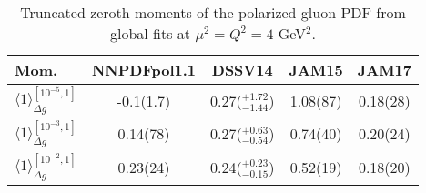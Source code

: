 \begin{table}[!b]
\centering
\footnotesize
\begin{tabular}{lcccc}
\toprule
Mom. & NNPDFpol1.1 & DSSV14 & JAM15 & JAM17\\
\midrule
$\langle 1\rangle_{\Delta g}^{[10^{-5},1]}$  
& -0.1(1.7) & 0.27($^{+1.72}_{-1.44}$)  & 1.08(87) & 0.18(28)\\
$\langle 1\rangle_{\Delta g}^{[10^{-3},1]}$  
& 0.14(78)  & 0.27($^{+0.63}_{-0.54}$)  & 0.74(40) & 0.20(24)\\
$\langle 1\rangle_{\Delta g}^{[10^{-2},1]}$  
& 0.23(24)  & 0.24($^{+0.23}_{-0.15}$)  & 0.52(19) & 0.18(20)\\
\bottomrule
\end{tabular}
\caption{\small Truncated zeroth moments of the polarized gluon PDF from 
global fits at $\mu^2=Q^2=4$ GeV$^2$.}
\label{tab:polgmom}
\end{table}
